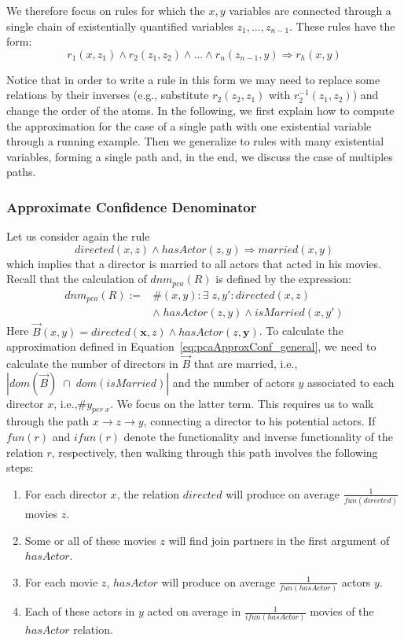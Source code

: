 {We therefore focus on rules for which the $x,y$ variables are connected through a single 
chain of existentially quantified 
variables $z_1,..., z_{n-1}$. These rules have the form:
$$
  r_1(x,z_1) \wedge r_2(z_1,z_2) \wedge ... \wedge r_n(z_{n-1},y) \Rightarrow r_h(x,y)
$$

Notice that in order to write a rule in this form we may need to replace some relations by their inverses
(e.g., substitute $r_2(z_2,z_1)$ with $r_2^{-1}(z_1,z_2)$)
and change the order of the atoms.
In the following, we first explain how to compute the approximation for the case of a single 
path with one existential variable through a running example.
Then we generalize to rules with many existential variables, forming a single path and, 
in the end, we discuss the case of multiples paths.


\subsubsection{Approximate Confidence Denominator}
Let us consider again the rule
\[
 directed(x,z) \wedge hasActor(z,y) \Rightarrow married(x,y)
\]
which implies that a director is married to all actors that acted in his movies.
Recall that the calculation of $dnm_{pca}(R)$ is defined by the expression:
\[
\begin{array}{rl}
dnm_{pca}(R) := &\#(x,y): \exists\; z, y': directed(x,z)  \\
  &\wedge\; hasActor(z,y) \wedge isMarried(x,y') \label{eq:denomPCAExample}
\end{array}
\]
Here $\vec{B}(x, y) = directed(\bm{x},z) \wedge hasActor(z,\bm{y})$.
To calculate the approximation defined in Equation~\ref{eq:pcaApproxConf_general}, 
we need to calculate the number of directors in $\vec{B}$ that are married, i.e.,  
$|dom(\vec{B})\;\cap\;dom(isMarried)|$ and the number of actors $y$ 
associated to each director $x$, i.e.,$\#y_{per\;x}$.
We focus on the latter term. This requires us to walk through the path $x \rightarrow z \rightarrow y$, connecting a director to his potential actors. If $fun(r)$ and $ifun(r)$
denote the functionality and inverse functionality of the relation $r$, respectively, then
walking through this path involves the following steps:
\begin{enumerate} \itemsep +0.3ex
 \item For each director $x$, the relation $directed$ will produce on average $\frac{1}{fun(directed)}$ movies $z$.
 \item Some or all of these movies $z$ will find join partners in the first argument of $hasActor$.
 \item For each movie $z$, $hasActor$ will produce on average $\frac{1}{fun(hasActor)}$ actors $y$.
 \item Each of these actors in $y$ acted on average in  $\frac{1}{ifun(hasActor)}$ movies of the $hasActor$ relation.
\end{enumerate}

}
